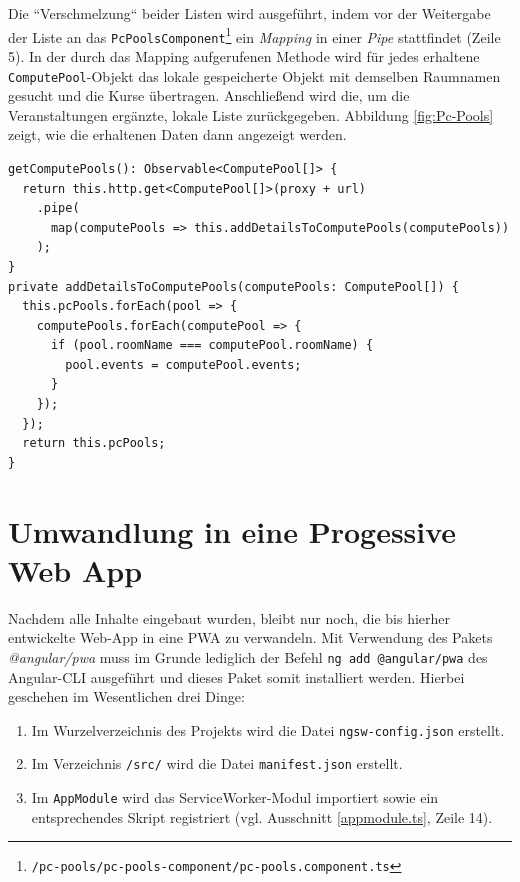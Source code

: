 Die ``Verschmelzung`` beider Listen wird ausgeführt, indem vor der Weitergabe der Liste an das \texttt{PcPoolsComponent}\footnote{\texttt{/pc-pools/pc-pools-component/pc-pools.component.ts}} ein \textit{Mapping} in einer \textit{Pipe} stattfindet (Zeile 5). In der durch das Mapping aufgerufenen Methode wird für jedes erhaltene \texttt{ComputePool}-Objekt das lokale gespeicherte Objekt mit demselben Raumnamen gesucht und die Kurse übertragen. Anschließend wird die, um die Veranstaltungen ergänzte, lokale Liste zurückgegeben. Abbildung \ref{fig:Pc-Pools} zeigt, wie die erhaltenen Daten dann angezeigt werden.

\begin{lstlisting}[float, floatplacement=h, style=htmlcssjs, caption={Ausschnitt aus PcPoolsService}, label={pcPools}]
getComputePools(): Observable<ComputePool[]> {
  return this.http.get<ComputePool[]>(proxy + url)
    .pipe(
      map(computePools => this.addDetailsToComputePools(computePools))
    );
}
private addDetailsToComputePools(computePools: ComputePool[]) {
  this.pcPools.forEach(pool => {
    computePools.forEach(computePool => {
      if (pool.roomName === computePool.roomName) {
        pool.events = computePool.events;
      }
    });
  });
  return this.pcPools;
}
\end{lstlisting}

\section{Umwandlung in eine Progessive Web App}
\label{sec:prog:pwa}

Nachdem alle Inhalte eingebaut wurden, bleibt nur noch, die bis hierher entwickelte Web-App in eine \acl{PWA} zu verwandeln. Mit Verwendung des Pakets \textit{@angular/pwa} muss im Grunde lediglich der Befehl \texttt{ng add @angular/pwa} des Angular-\acs{CLI} ausgeführt und dieses Paket somit installiert werden. Hierbei geschehen im Wesentlichen drei Dinge:
\begin{enumerate}
\item Im Wurzelverzeichnis des Projekts wird die Datei \texttt{ngsw-config.json} erstellt.
\item Im Verzeichnis \texttt{/src/} wird die Datei \texttt{manifest.json} erstellt.
\item Im \texttt{AppModule} wird das ServiceWorker-Modul importiert sowie ein entsprechendes Skript registriert (vgl. Ausschnitt \ref{appmodule.ts}, Zeile 14).
\end{enumerate}

